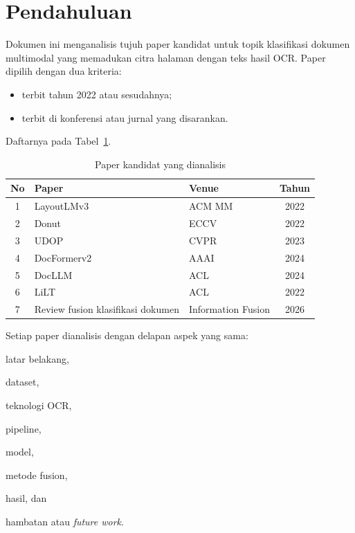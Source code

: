 
\section{Pendahuluan}\label{sec:pendahuluan}

Dokumen ini menganalisis tujuh paper kandidat untuk topik klasifikasi dokumen multimodal
yang memadukan citra halaman dengan teks hasil OCR. Paper dipilih dengan dua kriteria:
\begin{itemize}
  \item terbit tahun 2022 atau sesudahnya;
  \item terbit di konferensi atau jurnal yang disarankan.
\end{itemize}
Daftarnya pada Tabel~\ref{tab:kandidat}.

\begin{table}[H]
  \centering
  \caption{Paper kandidat yang dianalisis}
  \label{tab:kandidat}
  \fontsize{10}{12}\selectfont
  \begin{tabularx}{\textwidth}{|c|>{\raggedright\arraybackslash}X|l|c|}
    \hline
    \textbf{No} & \textbf{Paper} & \textbf{Venue} & \textbf{Tahun} \\ \hline
    1 & LayoutLMv3 \parencite{huang2022layoutlmv3} & ACM MM & 2022 \\ \hline
    2 & Donut \parencite{kim2022donut} & ECCV & 2022 \\ \hline
    3 & UDOP \parencite{tang2023udop} & CVPR & 2023 \\ \hline
    4 & DocFormerv2 \parencite{appalaraju2024docformerv2} & AAAI & 2024 \\ \hline
    5 & DocLLM \parencite{wang2024docllm} & ACL & 2024 \\ \hline
    6 & LiLT \parencite{wang2022lilt} & ACL & 2022 \\ \hline
    7 & Review fusion klasifikasi dokumen \parencite{mironczuk2026} &
        Information Fusion & 2026 \\ \hline
  \end{tabularx}
\end{table}

Setiap paper dianalisis dengan delapan aspek yang sama:
\begin{enumerate*}[label=(\arabic*)]
  \item latar belakang,
  \item dataset,
  \item teknologi OCR,
  \item pipeline,
  \item model,
  \item metode fusion,
  \item hasil, dan
  \item hambatan atau \textit{future work}.
\end{enumerate*}

